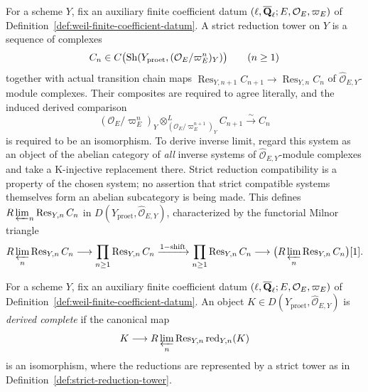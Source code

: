 \begin{definition}
\label{def:strict-reduction-tower}


For a scheme \(Y\), fix an auxiliary finite coefficient datum
\((\ell,\overline{\mathbf Q}_\ell;E,\mathcal O_E,\varpi_E)\) of
Definition~\ref{def:weil-finite-coefficient-datum}.
A strict reduction tower on \(Y\) is a sequence of complexes
\[
 C_n\in
 C\bigl(\operatorname{Sh}(Y_{\mathrm{proet}},(\mathcal O_E/\varpi_E^n)_Y)\bigr)
 \qquad(n\geq1)
\]
together with actual transition chain maps
\(\operatorname{Res}_{Y,n+1}C_{n+1}\to
  \operatorname{Res}_{Y,n}C_n\) of
\(\widehat{\mathcal O}_{E,Y}\)-module complexes.  Their composites are
required to agree literally, and the induced derived comparison
\[
 (\mathcal O_E/\varpi_E^n)_Y
 \otimes^L_{(\mathcal O_E/\varpi_E^{n+1})_Y} C_{n+1}
 \xrightarrow{\sim} C_n
\]
is required to be an isomorphism.  To derive inverse limit, regard this
system as an object of the abelian category of \emph{all} inverse systems of
\(\widehat{\mathcal O}_{E,Y}\)-module complexes and take a K-injective
replacement there.  Strict reduction compatibility is a property of the
chosen system; no assertion that strict compatible systems themselves form
an abelian subcategory is being made.  This defines
\(R\varprojlim_n\operatorname{Res}_{Y,n}C_n\) in
\(D(Y_{\mathrm{proet}},\widehat{\mathcal O}_{E,Y})\), characterized
by the functorial Milnor triangle
\[
 R\varprojlim_n\operatorname{Res}_{Y,n}C_n\longrightarrow
 \prod_{n\geq1}\operatorname{Res}_{Y,n}C_n
 \xrightarrow{1-\mathrm{shift}}
 \prod_{n\geq1}\operatorname{Res}_{Y,n}C_n
 \longrightarrow
 \bigl(R\varprojlim_n\operatorname{Res}_{Y,n}C_n\bigr)[1].
\]
\end{definition}


\begin{definition}
\label{def:derived-complete-integral-object}


For a scheme \(Y\), fix an auxiliary finite coefficient datum
\((\ell,\overline{\mathbf Q}_\ell;E,\mathcal O_E,\varpi_E)\) of
Definition~\ref{def:weil-finite-coefficient-datum}.
An object
\(K\in D(Y_{\mathrm{proet}},\widehat{\mathcal O}_{E,Y})\) is
\emph{derived complete} if
the canonical map
\[
 K\longrightarrow R\varprojlim_n
 \operatorname{Res}_{Y,n}\operatorname{red}_{Y,n}(K)
\]
is an isomorphism, where the reductions are represented by a strict tower as
in Definition~\ref{def:strict-reduction-tower}.
\end{definition}

